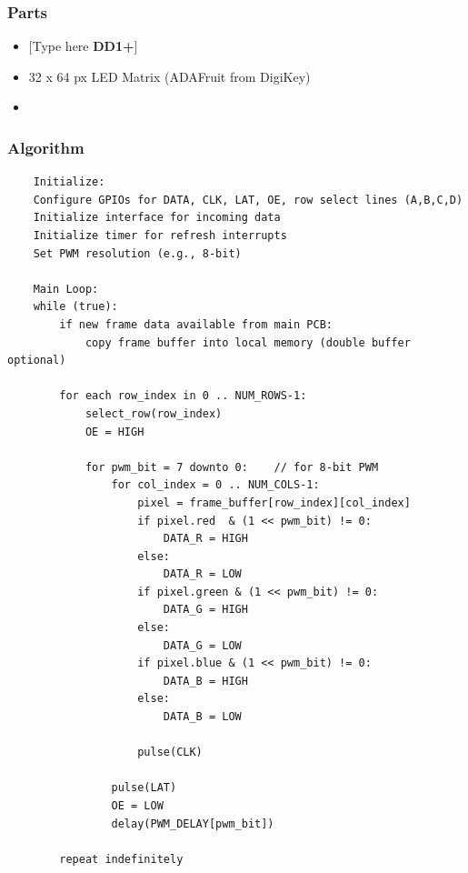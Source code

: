 \subsubsection{Parts}
\begin{itemize}
    \item {[Type here \textbf{DD1+}]}
    \item 32 x 64 px LED Matrix (ADAFruit from DigiKey)
    \item 
\end{itemize}

\subsubsection{Algorithm}

\begin{lstlisting}
    Initialize:
    Configure GPIOs for DATA, CLK, LAT, OE, row select lines (A,B,C,D)
    Initialize interface for incoming data
    Initialize timer for refresh interrupts
    Set PWM resolution (e.g., 8-bit)

    Main Loop:
    while (true):
        if new frame data available from main PCB:
            copy frame buffer into local memory (double buffer optional)
        
        for each row_index in 0 .. NUM_ROWS-1:
            select_row(row_index)        
            OE = HIGH                   
            
            for pwm_bit = 7 downto 0:    // for 8-bit PWM
                for col_index = 0 .. NUM_COLS-1:
                    pixel = frame_buffer[row_index][col_index]
                    if pixel.red  & (1 << pwm_bit) != 0:
                        DATA_R = HIGH
                    else:
                        DATA_R = LOW
                    if pixel.green & (1 << pwm_bit) != 0:
                        DATA_G = HIGH
                    else:
                        DATA_G = LOW
                    if pixel.blue & (1 << pwm_bit) != 0:
                        DATA_B = HIGH
                    else:
                        DATA_B = LOW
                    
                    pulse(CLK)           
                    
                pulse(LAT)                
                OE = LOW                   
                delay(PWM_DELAY[pwm_bit])  
                
        repeat indefinitely
\end{lstlisting}

